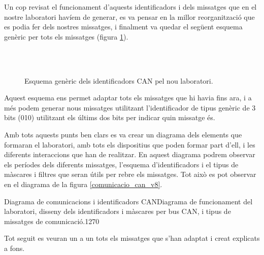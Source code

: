 Un cop revisat el funcionament d'aquests identificadors i dels missatges que en el nostre laboratori havíem de generar, es va pensar en la millor reorganització que es podia fer dels nostres missatges, i finalment va quedar el següent esquema genèric per tots els missatges (figura \ref{fig:bit_encoding:CAN:nou:generic}).

\begin{figure}[ht!]
	\begin{bytefield}[bitwidth=\linewidth/29]{29}
		    \\
	     \\
	       
	\end{bytefield}
    \caption{Esquema genèric dels identificadors CAN pel nou laboratori.}
    \label{fig:bit_encoding:CAN:nou:generic}
\end{figure}

Aquest esquema ens permet adaptar tots els missatges que hi havia fins ara, i a més podem generar nous missatges utilitzant l'identificador de tipus genèric de 3 bits (010) utilitzant els últims dos bits per indicar quin missatge és.

Amb tots aquests punts ben clars es va crear un diagrama dels elements que formaran el laboratori, amb tots els dispositius que poden formar part d'ell, i les diferents interaccions que han de realitzar. En aquest diagrama podrem observar els períodes dels diferents missatges, l'esquema d'identificadors i el tipus de màscares i filtres que seran útils per rebre els missatges. Tot això es pot observar en el diagrama de la figura \ref{comunicacio_can_v8}.

\begin{landscape}
{Diagrama de comunicacions i identificadors CAN}{Diagrama de funcionament del laboratori, disseny dels identificadors i màscares per bus CAN, i tipus de missatges de comunicació.}{1}{270}
\end{landscape}

Tot seguit es veuran un a un tots els missatges que s'han adaptat i creat explicats a fons.


